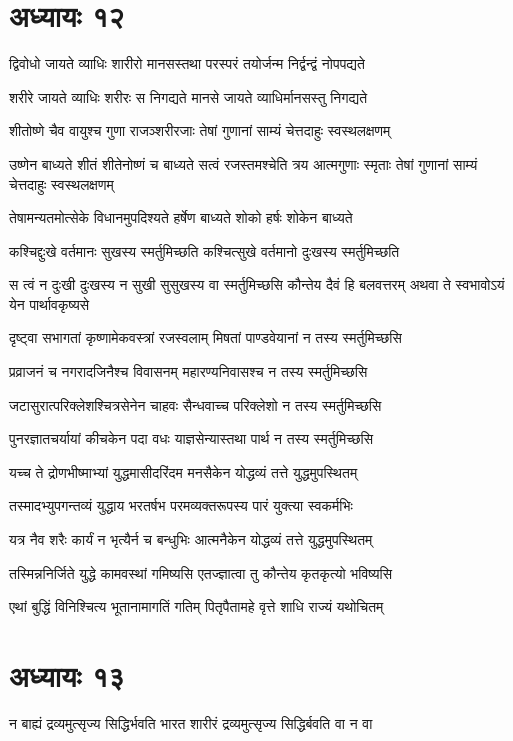 \chapter{अध्यायः १२}
\twolineshloka
{द्विवोधो जायते व्याधिः शारीरो मानसस्तथा}
{परस्परं तयोर्जन्म निर्द्वन्द्वं नोपपद्यते}


\twolineshloka
{शरीरे जायते व्याधिः शरीरः स निगद्यते}
{मानसे जायते व्याधिर्मानसस्तु निगद्यते}


\twolineshloka
{शीतोष्णे चैव वायुश्च गुणा राजञ्शरीरजाः}
{तेषां गुणानां साम्यं चेत्तदाहुः स्वस्थलक्षणम्}


उष्णेन बाध्यते शीतं शीतेनोष्णं च बाध्यते
\twolineshloka
{सत्वं रजस्तमश्चेति त्रय आत्मगुणाः स्मृताः}
{तेषां गुणानां साम्यं चेत्तदाहुः स्वस्थलक्षणम्}


\twolineshloka
{तेषामन्यतमोत्सेके विधानमुपदिश्यते}
{हर्षेण बाध्यते शोको हर्षः शोकेन बाध्यते}


\twolineshloka
{कश्चिद्दुःखे वर्तमानः सुखस्य स्मर्तुमिच्छति}
{कश्चित्सुखे वर्तमानो दुःखस्य स्मर्तुमिच्छति}


\threelineshloka
{स त्वं न दुःखी दुःखस्य न सुखी सुसुखस्य वा}
{स्मर्तुमिच्छसि कौन्तेय दैवं हि बलवत्तरम्}
{अथवा ते स्वभावोऽयं येन पार्थावकृष्यसे}


\twolineshloka
{दृष्ट्वा सभागतां कृष्णामेकवस्त्रां रजस्वलाम्}
{मिषतां पाण्डवेयानां न तस्य स्मर्तुमिच्छसि}


\twolineshloka
{प्रव्राजनं च नगरादजिनैश्च विवासनम्}
{महारण्यनिवासश्च न तस्य स्मर्तुमिच्छसि}


\twolineshloka
{जटासुरात्परिक्लेशश्चित्रसेनेन चाहवः}
{सैन्धवाच्च परिक्लेशो न तस्य स्मर्तुमिच्छसि}


\twolineshloka
{पुनरज्ञातचर्यायां कीचकेन पदा वधः}
{याज्ञसेन्यास्तथा पार्थ न तस्य स्मर्तुमिच्छसि}


\twolineshloka
{यच्च ते द्रोणभीष्माभ्यां युद्धमासीदरिंदम}
{मनसैकेन योद्धव्यं तत्ते युद्धमुपस्थितम्}


\twolineshloka
{तस्मादभ्युपगन्तव्यं युद्धाय भरतर्षभ}
{परमव्यक्तरूपस्य पारं युक्त्या स्वकर्मभिः}


\twolineshloka
{यत्र नैव शरैः कार्यं न भृत्यैर्न च बन्धुभिः}
{आत्मनैकेन योद्धव्यं तत्ते युद्धमुपस्थितम्}


\twolineshloka
{तस्मिन्ननिर्जिते युद्धे कामवस्थां गमिष्यसि}
{एतज्ज्ञात्वा तु कौन्तेय कृतकृत्यो भविष्यसि}


\twolineshloka
{एथां बुद्धिं विनिश्चित्य भूतानामागतिं गतिम्}
{पितृपैतामहे वृत्ते शाधि राज्यं यथोचितम्}


\chapter{अध्यायः १३}
\twolineshloka
{न बाह्यं द्रव्यमुत्सृज्य सिद्धिर्भवति भारत}
{शारीरं द्रव्यमुत्सृज्य सिद्धिर्बवति वा न वा}


